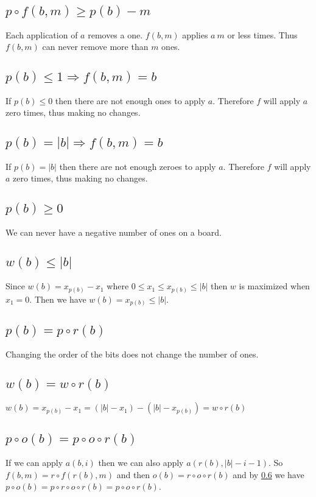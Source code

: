 \documentclass{article}
\begin{document}
\subsection{$p\circ f(b,m)\ge p(b)-m$}
Each application of $a$ removes a one. $f(b,m)$ applies $a\ m$ or less times. Thus $f(b,m)$ can never remove more than $m$ ones. 

\subsection{$p(b) \le 1 \Rightarrow f(b,m) = b$}
If $p(b) \le 0$ then there are not enough ones to apply $a$. 
Therefore $f$ will apply $a$ zero times, thus making no changes.

\subsection{$p(b) = |b| \Rightarrow f(b,m) = b$}
If $p(b) = |b| $ then there are not enough zeroes to apply $a$. 
Therefore $f$ will apply $a$ zero times, thus making no changes.

\subsection{$p(b)\ge 0$}
We can never have a negative number of ones on a board.

\subsection{$w(b)\le |b|$}
Since $w(b) = x_{p(b)}-x_1$ where $0\le x_1\le x_{p(b)} \le |b|$ then $w$ is maximized when $x_1=0$.
Then we have $w(b) =x_{p(b)}\le |b|$. 

\subsection{$p(b) = p\circ r(b)$}\label{rev_count}
Changing the order of the bits does not change the number of ones.

\subsection{$w(b) = w\circ r(b)$}
$w(b) = x_{p(b)}-x_1= (|b|-x_{1})-(|b|-x_{p(b)})=w\circ r(b)$

\subsection{$p\circ o(b) = p\circ o\circ r(b)$}
If we can apply $a(b,i)$ then we can also apply $a(r(b),|b|-i-1)$. 
So $f(b,m) = r\circ f(r(b),m)$ and then $o(b)=r\circ o\circ r(b)$ and by \ref{rev_count} we have $p\circ o(b) = p\circ r\circ o\circ r(b)=p\circ o\circ r(b)$.
\end{document}
